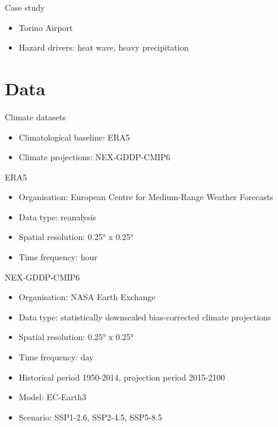 \documentclass[aspectratio=169]{beamer}
\begin{document}
\begin{frame}{Case study}
  \begin{itemize}
    \item<1-> Torino Airport
    \item<2-> Hazard drivers: heat wave, heavy precipitation
  \end{itemize}
\end{frame}



\section{Data}
\begin{frame}{Climate datasets}
  \begin{itemize}
    \item Climatological baseline: ERA5
    \item Climate projections: NEX-GDDP-CMIP6
  \end{itemize}
\end{frame}

\begin{frame}{ERA5}
  \begin{itemize}
    \item Organisation: European Centre for Medium-Range Weather Forecasts
    \item Data type: reanalysis
    \item Spatial resolution: 0.25° x 0.25°
    \item Time frequency: hour
  \end{itemize}
\end{frame}

\begin{frame}{NEX-GDDP-CMIP6}
  \begin{itemize}
    \item Organisation: NASA Earth Exchange
    \item Data type: statistically downscaled bias-corrected climate projections
    \item Spatial resolution: 0.25° x 0.25°
    \item Time frequency: day
    \item Historical period 1950-2014, projection period 2015-2100
    \item Model: EC-Earth3
    \item Scenario: SSP1-2.6, SSP2-4.5, SSP5-8.5
  \end{itemize}
\end{frame}
\end{document}
